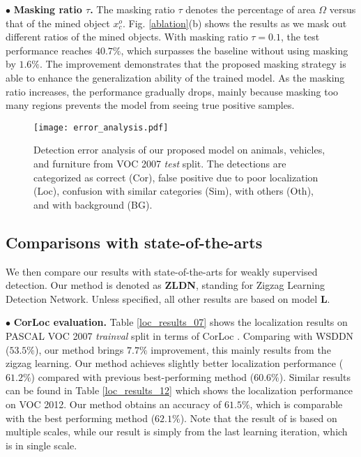 \documentclass[10pt,twocolumn,letterpaper]{article}
\begin{document}
\noindent $\bullet$ \textbf{Masking ratio $\tau$.} The masking ratio $\tau$ denotes the percentage of area $\Omega$ versus that of the mined object $x_c^o$. Fig. \ref{ablation}(b) shows the results as we mask out different ratios of the mined objects. With masking ratio $\tau\!=\!0.1$, the test performance reaches $40.7\%$, which surpasses the baseline without using masking by $1.6\%$. The improvement demonstrates that the proposed masking strategy is able to enhance the generalization ability of the trained model. As the masking ratio increases, the performance gradually drops, mainly because masking too many regions prevents the model from seeing true positive samples.

\begin{figure}[!t]
  \centering
\texttt{[image: error\_analysis.pdf]} \\
  \vspace{0.1cm}
  \caption{Detection error analysis \cite{hoiem2012diagnosing} of our proposed model on animals, vehicles, and furniture from VOC 2007 \emph{test} split. The detections are categorized as correct (Cor), false positive due to poor localization (Loc), confusion with similar categories (Sim), with others (Oth), and with background (BG).} \label{error_analysis}
\vspace{-0.1cm}
\end{figure}

\subsection{Comparisons with state-of-the-arts} We then compare our results with state-of-the-arts for weakly supervised detection. Our method is denoted as \textbf{ZLDN}, standing for Zigzag Learning Detection Network. Unless specified, all other results are based on model \textbf{L}.

\noindent $\bullet$ \textbf{CorLoc evaluation.} Table \ref{loc_results_07} shows the localization results on PASCAL VOC 2007 \emph{trainval} split in terms of CorLoc \cite{deselaers2012weakly}. Comparing with WSDDN \cite{bency2016weakly} ($53.5\%$), our method brings $7.7\%$ improvement, this mainly results from the zigzag learning. Our method achieves slightly better localization performance ($61.2\%$) compared with previous best-performing method \cite{Tang_2017_CVPR} ($60.6\%$). Similar results can be found in Table \ref{loc_results_12} which shows the localization performance on VOC 2012. Our method obtains an accuracy of $61.5\%$, which is comparable with the best performing method \cite{Tang_2017_CVPR} ($62.1\%$). Note that the result of \cite{Tang_2017_CVPR} is based on multiple scales, while our result is simply from the last learning iteration, which is in single scale.
\end{document}
